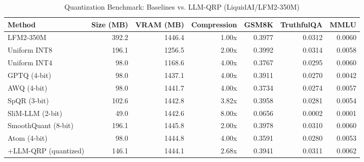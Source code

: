 \begin{table}[htbp]
  \centering
  \small
  \caption{Quantization Benchmark: Baselines vs. LLM-QRP (LiquidAI/LFM2-350M)}
  \label{tab:benchmark}
  \begin{tabular}{lrrrrrr}
    \toprule
    \textbf{Method} & \textbf{Size (MB)} & \textbf{VRAM (MB)} & \textbf{Compression} & \textbf{GSM8K} & \textbf{TruthfulQA} & \textbf{MMLU} \\
    \midrule
    LFM2-350M & 392.2 & 1446.4 & 1.00x & 0.3977 & 0.0312 & 0.0060 \\
    Uniform INT8 & 196.1 & 1256.5 & 2.00x & 0.3992 & 0.0314 & 0.0058 \\
    Uniform INT4 & 98.0 & 1168.6 & 4.00x & 0.3767 & 0.0295 & 0.0060 \\
    GPTQ (4-bit) & 98.0 & 1437.1 & 4.00x & 0.3911 & 0.0270 & 0.0042 \\
    AWQ (4-bit) & 98.0 & 1441.7 & 4.00x & 0.3734 & 0.0274 & 0.0057 \\
    SpQR (3-bit) & 102.6 & 1442.8 & 3.82x & 0.3958 & 0.0281 & 0.0054 \\
    SliM-LLM (2-bit) & 49.0 & 1442.6 & 8.00x & 0.0656 & 0.0002 & 0.0001 \\
    SmoothQuant (8-bit) & 196.1 & 1445.8 & 2.00x & 0.3978 & 0.0310 & 0.0060 \\
    Atom (4-bit) & 98.0 & 1444.8 & 4.00x & 0.3591 & 0.0280 & 0.0053 \\
    \midrule
    +LLM-QRP (quantized) & 146.1 & 1444.1 & 2.68x & 0.3941 & 0.0311 & 0.0062 \\
    \bottomrule
  \end{tabular}
\end{table}

